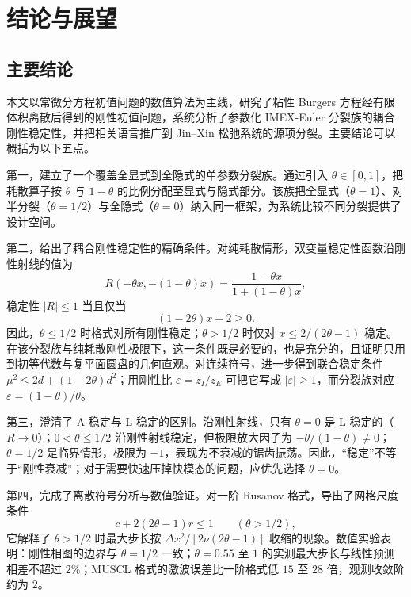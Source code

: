 \chapter{结论与展望}

\section{主要结论}

本文以常微分方程初值问题的数值算法为主线，研究了粘性 Burgers 方程经有限体积离散后得到的刚性初值问题，系统分析了参数化 IMEX-Euler 分裂族的耦合刚性稳定性，并把相关语言推广到 Jin--Xin 松弛系统的源项分裂。主要结论可以概括为以下五点。

第一，建立了一个覆盖全显式到全隐式的单参数分裂族。通过引入 $\theta\in[0,1]$，把耗散算子按 $\theta$ 与 $1-\theta$ 的比例分配至显式与隐式部分。该族把全显式（$\theta=1$）、对半分裂（$\theta=1/2$）与全隐式（$\theta=0$）纳入同一框架，为系统比较不同分裂提供了设计空间。

第二，给出了耦合刚性稳定性的精确条件。对纯耗散情形，双变量稳定性函数沿刚性射线的值为
\begin{equation}
  R\left(-\theta x,-(1-\theta)x\right)=\frac{1-\theta x}{1+(1-\theta)x},
\end{equation}
稳定性 $|R|\le1$ 当且仅当
\begin{equation}
  (1-2\theta)x+2\ge0.
\end{equation}
因此，$\theta\le1/2$ 时格式对所有刚性稳定；$\theta>1/2$ 时仅对 $x\le2/(2\theta-1)$ 稳定。在该分裂族与纯耗散刚性极限下，这一条件既是必要的，也是充分的，且证明只用到初等代数与复平面圆盘的几何直观。对连续符号，进一步得到联合稳定条件 $\mu^2\le2d+(1-2\theta)d^2$；用刚性比 $\varepsilon=z_I/z_E$ 可把它写成 $|\varepsilon|\ge1$，而分裂族对应 $\varepsilon=(1-\theta)/\theta$。

第三，澄清了 A-稳定与 L-稳定的区别。沿刚性射线，只有 $\theta=0$ 是 L-稳定的（$R\to0$）；$0<\theta\le1/2$ 沿刚性射线稳定，但极限放大因子为 $-\theta/(1-\theta)\ne0$；$\theta=1/2$ 是临界情形，极限为 $-1$，表现为不衰减的锯齿振荡。因此，“稳定”不等于“刚性衰减”；对于需要快速压掉快模态的问题，应优先选择 $\theta=0$。

第四，完成了离散符号分析与数值验证。对一阶 Rusanov 格式，导出了网格尺度条件
\begin{equation}
  c+2(2\theta-1)r\le1\qquad(\theta>1/2),
\end{equation}
它解释了 $\theta>1/2$ 时最大步长按 $\Delta x^2/[2\nu(2\theta-1)]$ 收缩的现象。数值实验表明：刚性相图的边界与 $\theta=1/2$ 一致；$\theta=0.55$ 至 $1$ 的实测最大步长与线性预测相差不超过 $2\%$；MUSCL 格式的激波误差比一阶格式低 $15$ 至 $28$ 倍，观测收敛阶约为 $2$。

